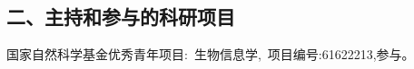 \fi

\vspace{22pt}
\subsection*{二、主持和参与的科研项目}
\ifblindreview
\else
\begin{enumerate}[label={[\arabic*]},itemindent=2em,wide]

    \item 国家自然科学基金优秀青年项目:~生物信息学,~项目编号:61622213,参与。

\end{enumerate}

\fi

\newpage

\ifblindreview
\else

\newpage
\fi
